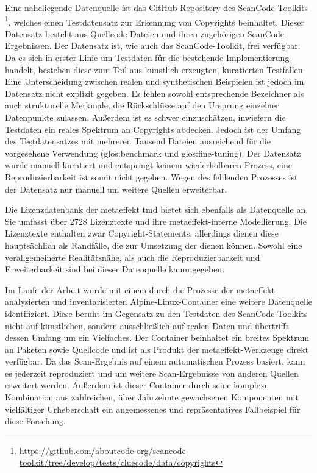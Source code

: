 Eine naheliegende Datenquelle ist das GitHub-Repository des ScanCode-Toolkits \footnote{\url{https://github.com/aboutcode-org/scancode-toolkit/tree/develop/tests/cluecode/data/copyrights}}, welches einen Testdatensatz zur Erkennung von Copyrights beinhaltet.
Dieser Datensatz besteht aus Quellcode-Dateien und ihren zugehörigen ScanCode-Ergebnissen.
Der Datensatz ist, wie auch das ScanCode-Toolkit, frei verfügbar.
Da es sich in erster Linie um Testdaten für die bestehende Implementierung handelt, bestehen diese zum Teil aus künstlich erzeugten, kuratierten Testfällen.
Eine Unterscheidung zwischen realen und synthetischen Beispielen ist jedoch im Datensatz nicht explizit gegeben.
Es fehlen sowohl entsprechende Bezeichner als auch strukturelle Merkmale, die Rückschlüsse auf den Ursprung einzelner Datenpunkte zulassen.
Außerdem ist es schwer einzuschätzen, inwiefern die Testdaten ein reales Spektrum an Copyrights abdecken.
Jedoch ist der Umfang des Testdatensatzes mit mehreren Tausend Dateien ausreichend für die vorgesehene Verwendung (\gls{glos:benchmark} und \gls{glos:fine-tuning}).
Der Datensatz wurde manuell kuratiert und entspringt keinem wiederholbaren Prozess, eine Reproduzierbarkeit ist somit nicht gegeben.
Wegen des fehlenden Prozesses ist der Datensatz nur manuell um weitere Quellen erweiterbar.

Die Lizenzdatenbank der metaeffekt \gls{tmd} bietet sich ebenfalls als Datenquelle an.
Sie umfasst über \num{2728} Lizenztexte und ihre metaeffekt-interne Modellierung.
Die Lizenztexte enthalten zwar Copyright-Statements, allerdings dienen diese hauptsächlich als Randfälle, die zur Umsetzung der  dienen können.
Sowohl eine verallgemeinerte Realitätsnähe, als auch die Reproduzierbarkeit und Erweiterbarkeit sind bei dieser Datenquelle kaum gegeben.

Im Laufe der Arbeit wurde mit einem durch die Prozesse der metaeffekt analysierten und inventarisierten Alpine-Linux-Container eine weitere Datenquelle identifiziert.
Diese beruht im Gegensatz zu den Testdaten des ScanCode-Toolkits nicht auf künstlichen, sondern ausschließlich auf realen Daten und übertrifft dessen Umfang um ein Vielfaches.
Der Container beinhaltet ein breites Spektrum an Paketen sowie Quellcode und ist als Produkt der metaeffekt-Werkzeuge direkt verfügbar.
Da das Scan-Ergebnis auf einem automatischen Prozess basiert, kann es jederzeit reproduziert und um weitere Scan-Ergebnisse von anderen Quellen erweitert werden.
Außerdem ist dieser Container durch seine komplexe Kombination aus zahlreichen, über Jahrzehnte gewachsenen Komponenten mit vielfältiger Urheberschaft ein angemessenes und repräsentatives Fallbeispiel für diese Forschung.

